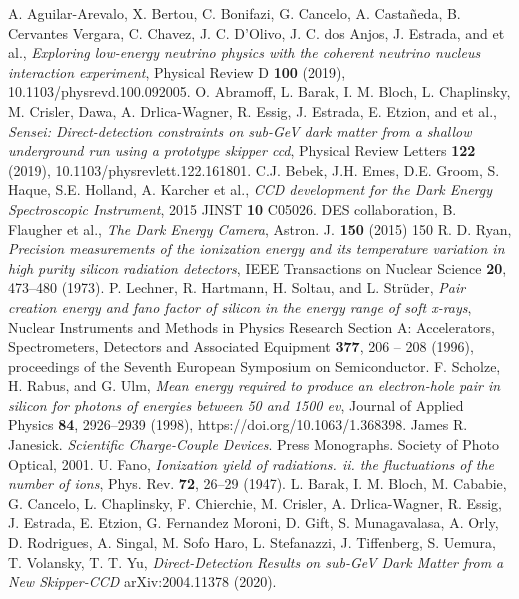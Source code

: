 \documentclass[a4paper,12pt]{report} %
\begin{document}
\begin{thebibliography}{99}

A. Aguilar-Arevalo, X. Bertou, C. Bonifazi, G. Cancelo, A. Castañeda, B. Cervantes Vergara, C. Chavez, J. C. D’Olivo, J. C. dos Anjos, J. Estrada, and et al., \textit{Exploring low-energy neutrino physics with the coherent neutrino nucleus interaction experiment}, Physical Review D \textbf{100} (2019), 10.1103/physrevd.100.092005.
O. Abramoff, L. Barak, I. M. Bloch, L. Chaplinsky, M. Crisler, Dawa, A. Drlica-Wagner, R. Essig, J. Estrada, E. Etzion, and et al., \textit{Sensei: Direct-detection constraints on sub-GeV dark matter from a shallow underground run using a prototype skipper ccd}, Physical Review Letters \textbf{122} (2019), 10.1103/physrevlett.122.161801.
C.J. Bebek, J.H. Emes, D.E. Groom, S. Haque, S.E. Holland, A. Karcher et al., \textit{CCD development for the Dark Energy Spectroscopic Instrument}, 2015 JINST \textbf{10} C05026.
DES collaboration, B. Flaugher et al., \textit{The Dark Energy Camera}, Astron. J. \textbf{150} (2015) 150
R. D. Ryan, \textit{Precision measurements of the ionization energy and its temperature variation in high purity silicon radiation detectors}, IEEE Transactions on Nuclear Science \textbf{20}, 473–480 (1973).
P. Lechner, R. Hartmann, H. Soltau, and L. Strüder, \textit{Pair creation energy and fano factor of silicon in the energy range of soft x-rays}, Nuclear Instruments and Methods in Physics Research Section A: Accelerators, Spectrometers, Detectors and Associated Equipment \textbf{377}, 206 – 208 (1996), proceedings of the Seventh European Symposium on Semiconductor.
F. Scholze, H. Rabus, and G. Ulm, \textit{Mean energy required to produce an electron-hole pair in silicon for photons of energies between 50 and 1500 ev}, Journal of Applied Physics \textbf{84}, 2926–2939 (1998),
https://doi.org/10.1063/1.368398.
James R. Janesick. \textit{Scientific Charge-Couple Devices}. Press Monographs. Society of Photo Optical, 2001.
U. Fano, \textit{Ionization yield of radiations. ii. the fluctuations of the number of ions}, Phys. Rev. \textbf{72}, 26–29 (1947).
L. Barak, I. M. Bloch, M. Cababie, G. Cancelo, L. Chaplinsky, F. Chierchie, M. Crisler, A. Drlica-Wagner, R. Essig, J. Estrada, E. Etzion, G. Fernandez Moroni, D. Gift, S. Munagavalasa, A. Orly, D. Rodrigues, A. Singal, M. Sofo Haro, L. Stefanazzi, J. Tiffenberg, S. Uemura, T. Volansky, T. T. Yu, \textit{Direct-Detection Results on sub-GeV Dark Matter from a New Skipper-CCD} arXiv:2004.11378 (2020).


\end{thebibliography}
\end{document}
